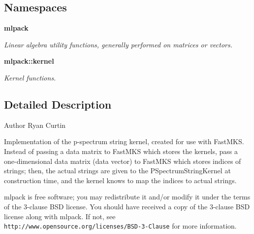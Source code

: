 \subsection*{Namespaces}
\begin{DoxyCompactItemize}
\item 
 {\bf mlpack}
\begin{DoxyCompactList}\small\item\em Linear algebra utility functions, generally performed on matrices or vectors. \end{DoxyCompactList}\item 
 {\bf mlpack\+::kernel}
\begin{DoxyCompactList}\small\item\em Kernel functions. \end{DoxyCompactList}\end{DoxyCompactItemize}


\subsection{Detailed Description}
\begin{DoxyAuthor}{Author}
Ryan Curtin
\end{DoxyAuthor}
Implementation of the p-\/spectrum string kernel, created for use with Fast\+M\+KS. Instead of passing a data matrix to Fast\+M\+KS which stores the kernels, pass a one-\/dimensional data matrix (data vector) to Fast\+M\+KS which stores indices of strings; then, the actual strings are given to the P\+Spectrum\+String\+Kernel at construction time, and the kernel knows to map the indices to actual strings.

mlpack is free software; you may redistribute it and/or modify it under the terms of the 3-\/clause B\+SD license. You should have received a copy of the 3-\/clause B\+SD license along with mlpack. If not, see {\tt http\+://www.\+opensource.\+org/licenses/\+B\+S\+D-\/3-\/\+Clause} for more information. 